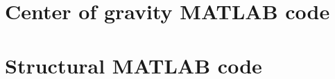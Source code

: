 \chapter{Center of gravity MATLAB code}\label{appendix:cg_code}


\chapter{Structural MATLAB code}\label{appendix:structural_code}

